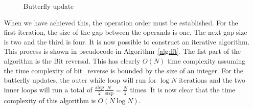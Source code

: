 \begin{figure}
    \centering
    \caption{Butterfly update \cite{fft:derivation}}
    \label{fig:butterfly:update}
\end{figure}

When we have achieved this, the operation order must be established. For the first iteration, the size of the gap between the operands is one. The next gap size is two and the third is four. It is now possible to construct an iterative algorithm. This process is shown in pseudocode in Algorithm~\ref{alg:fft}. The fist part of the algorithm is the Bit reversal. This has clearly $O(N)$ time complexity assuming the time complexity of bit\_reverse is bounded by the size of an integer. For the butterfly updates, the outer while loop will run for $\log{}N$ iterations and the two inner loops will run a total of $\frac{step}{2} \frac{N}{step} = \frac{N}{2}$ times. It is now clear that the time complexity of this algorithm is $O(N\log{}N)$.


